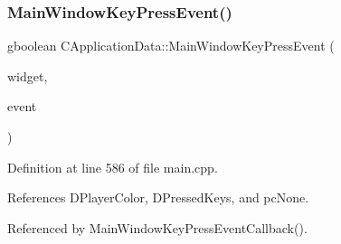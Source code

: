 \subsubsection{\texorpdfstring{Main\+Window\+Key\+Press\+Event()}{MainWindowKeyPressEvent()}}
{\footnotesize\ttfamily gboolean C\+Application\+Data\+::\+Main\+Window\+Key\+Press\+Event (\begin{DoxyParamCaption}\item[{Gtk\+Widget $\ast$}]{widget,  }\item[{Gdk\+Event\+Key $\ast$}]{event }\end{DoxyParamCaption})\hspace{0.3cm}{\ttfamily [protected]}}



Definition at line 586 of file main.\+cpp.



References D\+Player\+Color, D\+Pressed\+Keys, and pc\+None.



Referenced by Main\+Window\+Key\+Press\+Event\+Callback().


